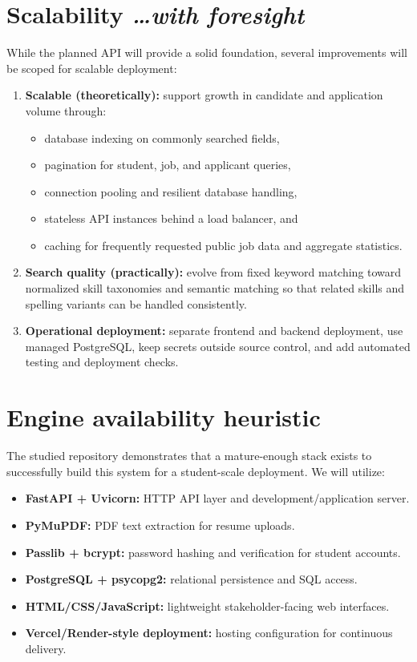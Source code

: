 \documentclass[11pt,a4paper]{article}
\newcommand{\BvrHint}[1]{%
  {\normalfont\normalsize\itshape\hfill #1}}
\begin{document}
\section{Scalability\BvrHint{\ldots with foresight}}
While the planned API will provide a solid foundation, several improvements will be scoped for scalable deployment:

\begin{enumerate}[leftmargin=0.7cm]
    \item \textbf{Scalable (theoretically):} support growth in candidate and application volume through:
    \begin{itemize}[leftmargin=0.7cm]
        \item database indexing on commonly searched fields,
        \item pagination for student, job, and applicant queries,
        \item connection pooling and resilient database handling,
        \item stateless API instances behind a load balancer, and
        \item caching for frequently requested public job data and aggregate statistics.
    \end{itemize}

    \item \textbf{Search quality (practically):} evolve from fixed keyword matching toward normalized skill taxonomies and semantic matching so that related skills and spelling variants can be handled consistently.

    \item \textbf{Operational deployment:} separate frontend and backend deployment, use managed PostgreSQL, keep secrets outside source control, and add automated testing and deployment checks.
\end{enumerate}

\section{Engine availability heuristic}
The studied repository demonstrates that a mature-enough stack exists to successfully build this system for a student-scale deployment. We will utilize:
\begin{itemize}[leftmargin=0.7cm]
    \item \textbf{FastAPI + Uvicorn:} HTTP API layer and development/application server.
    \item \textbf{PyMuPDF:} PDF text extraction for resume uploads.
    \item \textbf{Passlib + bcrypt:} password hashing and verification for student accounts.
    \item \textbf{PostgreSQL + psycopg2:} relational persistence and SQL access.
    \item \textbf{HTML/CSS/JavaScript:} lightweight stakeholder-facing web interfaces.
    \item \textbf{Vercel/Render-style deployment:} hosting configuration for continuous delivery.
\end{itemize}
\end{document}
